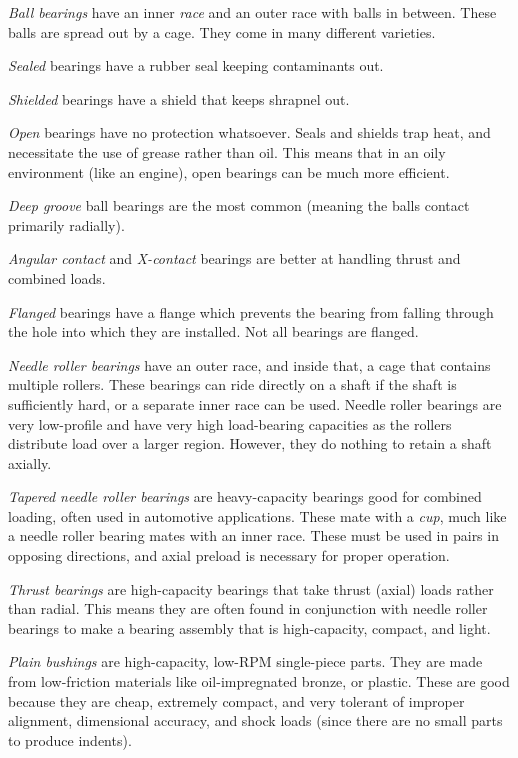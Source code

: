 	\begin{asparaenum}[a)]
		\item \textit{Ball bearings} have an inner \textit{race} and an outer race with balls in between. These balls are spread out by a cage. They come in many different varieties.
		\begin{asparaitem}[\ \ \ ]
			\item \textit{Sealed} bearings have a rubber seal keeping contaminants out.
			\item \textit{Shielded} bearings have a shield that keeps shrapnel out.
			\item \textit{Open} bearings have no protection whatsoever. Seals and shields trap heat, and necessitate the use of grease rather than oil. This means that in an oily environment (like an engine), open bearings can be much more efficient.
			
			\item \textit{Deep groove} ball bearings are the most common (meaning the balls contact primarily radially).
			\item \textit{Angular contact} and \textit{X-contact} bearings are better at handling thrust and combined loads.
			
			\item \textit{Flanged} bearings have a flange which prevents the bearing from falling through the hole into which they are installed. Not all bearings are flanged.
		\end{asparaitem}
		\item \textit{Needle roller bearings} have an outer race, and inside that, a cage that contains multiple rollers. These bearings can ride directly on a shaft if the shaft is sufficiently hard, or a separate inner race can be used. Needle roller bearings are very low-profile and have very high load-bearing capacities as the rollers distribute load over a larger region. However, they do nothing to retain a shaft axially.
		\item \textit{Tapered needle roller bearings} are heavy-capacity bearings good for combined loading, often used in automotive applications. These mate with a \textit{cup}, much like a needle roller bearing mates with an inner race. These must be used in pairs in opposing directions, and axial preload is necessary for proper operation.
		\item \textit{Thrust bearings} are high-capacity bearings that take thrust (axial) loads rather than radial. This means they are often found in conjunction with needle roller bearings to make a bearing assembly that is high-capacity, compact, and light.
		\item \textit{Plain bushings} are high-capacity, low-RPM single-piece parts. They are made from low-friction materials like oil-impregnated bronze, or plastic. These are good because they are cheap, extremely compact, and very tolerant of improper alignment, dimensional accuracy, and shock loads (since there are no small parts to produce indents).
	\end{asparaenum}
	
